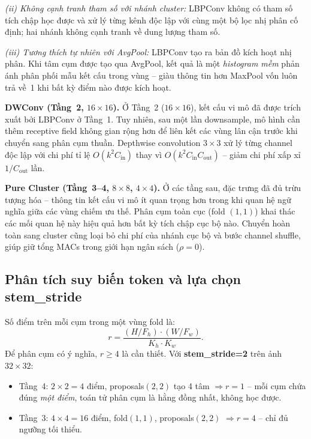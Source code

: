 \documentclass[conference]{IEEEtran}
\begin{document}
\textit{(ii) Không cạnh tranh tham số với nhánh cluster:}
LBPConv không có tham số tích chập học được và xử lý từng kênh độc lập
với cùng một bộ lọc nhị phân cố định; hai nhánh không cạnh tranh về
dung lượng tham số.

\textit{(iii) Tương thích tự nhiên với AvgPool:}
LBPConv tạo ra bản đồ kích hoạt nhị phân. Khi tâm cụm được tạo qua
AvgPool, kết quả là một \emph{histogram mềm} phản ánh phân phối mẫu
kết cấu trong vùng -- giàu thông tin hơn MaxPool vốn luôn trả về~1
khi bất kỳ điểm nào được kích hoạt.

\noindent\textbf{DWConv (Tầng~2, $16\!\times\!16$).}
Ở Tầng~2 ($16\!\times\!16$), kết cấu vi mô đã được trích xuất bởi
LBPConv ở Tầng~1. Tuy nhiên, sau một lần downsample, mô hình cần
thêm receptive field không gian rộng hơn để liên kết các vùng lân
cận trước khi chuyển sang phân cụm thuần. Depthwise convolution
$3\!\times\!3$ xử lý từng channel độc lập với chi phí tỉ lệ
$O(k^2 C_\mathrm{in})$ thay vì $O(k^2 C_\mathrm{in} C_\mathrm{out})$
-- giảm chi phí xấp xỉ $1/C_\mathrm{out}$ lần.

\noindent\textbf{Pure Cluster (Tầng~3--4, $8\!\times\!8$,
$4\!\times\!4$).}
Ở các tầng sau, đặc trưng đã đủ trừu tượng hóa -- thông tin kết cấu
vi mô ít quan trọng hơn trong khi quan hệ ngữ nghĩa giữa các vùng
chiếm ưu thế. Phân cụm toàn cục (fold $(1,1)$) khai thác các mối
quan hệ này hiệu quả hơn bất kỳ tích chập cục bộ nào. Chuyển hoàn
toàn sang cluster cũng loại bỏ chi phí của nhánh cục bộ và bước
channel shuffle, giúp giữ tổng MACs trong giới hạn ngân sách
($\rho{=}0$).

\subsection{Phân tích suy biến token và lựa chọn stem\_stride}
\label{sec:degeneracy}

Số điểm trên mỗi cụm trong một vùng fold là:
\begin{equation}
  r = \frac{(H/F_h)\cdot(W/F_w)}{K_h\cdot K_w}.
  \label{eq:ratio}
\end{equation}
Để phân cụm có ý nghĩa, $r\geq4$ là cần thiết. Với
\textbf{stem\_stride=2} trên ảnh $32\!\times\!32$:
\begin{itemize}
  \item Tầng~4: $2\!\times\!2=4$ điểm, proposals$(2,2)$ tạo 4 tâm
        $\Rightarrow r=1$ -- mỗi cụm chứa đúng \emph{một điểm}, toán
        tử phân cụm là hằng đồng nhất, không học được.
  \item Tầng~3: $4\!\times\!4=16$ điểm, fold$(1,1)$,
        proposals$(2,2)$ $\Rightarrow r=4$ -- chỉ đủ ngưỡng tối thiểu.
\end{itemize}
\end{document}
